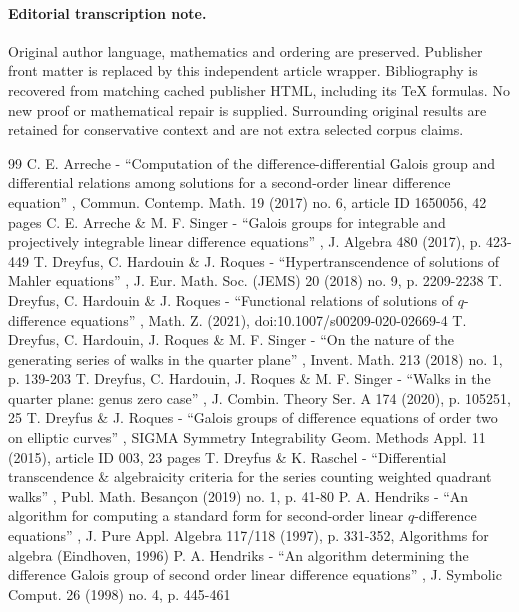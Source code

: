 \documentclass[11pt]{article}
\numberwithin{equation}{section}\providecommand{\loccit}{\textit{loc.\ cit.}}
\begin{document}
\paragraph{Editorial transcription note.}
Original author language, mathematics and ordering are preserved. Publisher front matter is replaced by this independent article wrapper. Bibliography is recovered from matching cached publisher HTML, including its TeX formulas. No new proof or mathematical repair is supplied. Surrounding original results are retained for conservative context and are not extra selected corpus claims.
\clearpage

\begin{thebibliography}{99}
 C. E. Arreche - “Computation of the difference-differential Galois group and differential relations among solutions for a second-order linear difference equation” , Commun. Contemp. Math. 19 (2017) no. 6, article ID 1650056, 42 pages
 C. E. Arreche \& M. F. Singer - “Galois groups for integrable and projectively integrable linear difference equations” , J. Algebra 480 (2017), p. 423-449
 T. Dreyfus, C. Hardouin \& J. Roques - “Hypertranscendence of solutions of Mahler equations” , J. Eur. Math. Soc. (JEMS) 20 (2018) no. 9, p. 2209-2238
 T. Dreyfus, C. Hardouin \& J. Roques - “Functional relations of solutions of $ q $-difference equations” , Math. Z. (2021), doi:10.1007/s00209-020-02669-4
 T. Dreyfus, C. Hardouin, J. Roques \& M. F. Singer - “On the nature of the generating series of walks in the quarter plane” , Invent. Math. 213 (2018) no. 1, p. 139-203
 T. Dreyfus, C. Hardouin, J. Roques \& M. F. Singer - “Walks in the quarter plane: genus zero case” , J. Combin. Theory Ser. A 174 (2020), p. 105251, 25
 T. Dreyfus \& J. Roques - “Galois groups of difference equations of order two on elliptic curves” , SIGMA Symmetry Integrability Geom. Methods Appl. 11 (2015), article ID 003, 23 pages
 T. Dreyfus \& K. Raschel - “Differential transcendence \& algebraicity criteria for the series counting weighted quadrant walks” , Publ. Math. Besançon (2019) no. 1, p. 41-80
 P. A. Hendriks - “An algorithm for computing a standard form for second-order linear $q$-difference equations” , J. Pure Appl. Algebra 117/118 (1997), p. 331-352, Algorithms for algebra (Eindhoven, 1996)
 P. A. Hendriks - “An algorithm determining the difference Galois group of second order linear difference equations” , J. Symbolic Comput. 26 (1998) no. 4, p. 445-461

\end{thebibliography}
\end{document}
